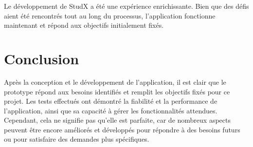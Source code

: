Le développement de StudX a été une expérience enrichissante. 
Bien que des défis aient été rencontrés tout au long du processus, 
l'application fonctionne maintenant et répond aux objectifs initialement fixés.

\section*{Conclusion}
Après la conception et le développement de l'application, il est clair que le prototype répond aux besoins identifiés et remplit les objectifs fixés pour ce projet. 
Les tests effectués ont démontré la fiabilité et la performance de l'application, ainsi que sa capacité à gérer les fonctionnalités attendues. 
Cependant, cela ne signifie pas qu'elle est parfaite, car de nombreux aspects peuvent être encore améliorés et développés pour répondre à des besoins futurs ou pour satisfaire des demandes plus spécifiques. 